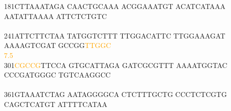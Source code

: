 \documentclass[11pt,twoside,reqno,a4paper]{article}
\begin{document}
{181\hspace*{1\charwidth}CTTAAATAGA	CAACTGCAAA	ACGGAAATGT	ACATCATAAA	AATATTAAAA	ATTCTCTGTC	\\
\hspace*{4\charwidth}\hspace*{1\charwidth}\hspace*{1\charwidth}\hspace*{1\charwidth}\hspace*{1\charwidth}\hspace*{1\charwidth}\hspace*{1\charwidth}\\
241\hspace*{1\charwidth}ATTCTTCTAA	TATGGTCTTT	TTGGACATTC	TTGGAAAGAT	AAAAGTCGAT	GCCGG\textcolor{orange}{T}\textcolor{orange}{T}\textcolor{orange}{G}\textcolor{orange}{G}\textcolor{orange}{C}	\\
\hspace*{4\charwidth}\hspace*{1\charwidth}\hspace*{1\charwidth}\hspace*{1\charwidth}\hspace*{1\charwidth}\hspace*{1\charwidth}\hspace*{55\charwidth}\textcolor{orange}{7.5}\hspace*{1\charwidth}\\
301\hspace*{1\charwidth}\textcolor{orange}{C}\textcolor{orange}{G}\textcolor{orange}{C}\textcolor{orange}{C}\textcolor{orange}{G}TTCCA	GTGCATTAGA	GATCGCGTTT	AAAATGGTAC	CCCGATGGGC	TGTCAAGGCC	\\
\hspace*{4\charwidth}\hspace*{1\charwidth}\hspace*{1\charwidth}\hspace*{1\charwidth}\hspace*{1\charwidth}\hspace*{1\charwidth}\hspace*{1\charwidth}\\
361\hspace*{1\charwidth}GTAAATCTAG	AATAGGGGCA	CTCTTTGCTG	CCCTCTCGTG	CAGCTCATGT	ATTTTCATAA	\\
\hspace*{4\charwidth}\hspace*{1\charwidth}\hspace*{1\charwidth}\hspace*{1\charwidth}\hspace*{1\charwidth}\hspace*{1\charwidth}\hspace*{1\charwidth}\\
}
\end{document}
